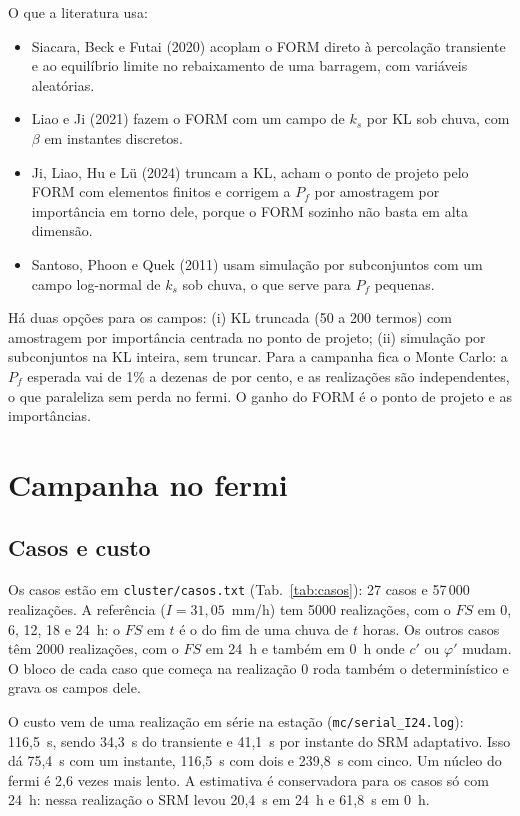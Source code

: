 \documentclass[11pt,a4paper]{article}
\begin{document}
O que a literatura usa:
\begin{itemize}
\item Siacara, Beck e Futai (2020) acoplam o FORM direto à percolação transiente e ao equilíbrio limite no rebaixamento de
uma barragem, com variáveis aleatórias.
\item Liao e Ji (2021) fazem o FORM com um campo de $k_s$ por KL sob chuva, com $\beta$ em instantes discretos.
\item Ji, Liao, Hu e Lü (2024) truncam a KL, acham o ponto de projeto pelo FORM com elementos finitos e corrigem a $P_f$
por amostragem por importância em torno dele, porque o FORM sozinho não basta em alta dimensão.
\item Santoso, Phoon e Quek (2011) usam simulação por subconjuntos com um campo log-normal de $k_s$ sob chuva, o que
serve para $P_f$ pequenas.
\end{itemize}
Há duas opções para os campos: (i) KL truncada (50 a 200 termos) com amostragem por importância centrada no ponto de
projeto; (ii) simulação por subconjuntos na KL inteira, sem truncar. Para a campanha fica o Monte Carlo: a $P_f$ esperada
vai de 1\% a dezenas de por cento, e as realizações são independentes, o que paraleliza sem perda no fermi. O ganho do
FORM é o ponto de projeto e as importâncias.

\section{Campanha no fermi}\label{sec:fermi}
\subsection{Casos e custo}
Os casos estão em \texttt{cluster/casos.txt} (Tab.~\ref{tab:casos}): 27 casos e 57\,000 realizações. A referência
($I = 31{,}05$~mm/h) tem 5000 realizações, com o $FS$ em 0, 6, 12, 18 e 24~h: o $FS$ em $t$ é o do fim de uma chuva de
$t$ horas. Os outros casos têm 2000 realizações, com o $FS$ em 24~h e também em 0~h onde $c'$ ou $\varphi'$ mudam. O
bloco de cada caso que começa na realização 0 roda também o determinístico e grava os campos dele.

O custo vem de uma realização em série na estação (\texttt{mc/serial\_I24.log}): 116,5~s, sendo 34,3~s do transiente e
41,1~s por instante do SRM adaptativo. Isso dá 75,4~s com um instante, 116,5~s com dois e 239,8~s com cinco. Um núcleo
do fermi é 2,6 vezes mais lento. A estimativa é conservadora para os casos só com 24~h: nessa realização o SRM levou
20,4~s em 24~h e 61,8~s em 0~h.
\end{document}
